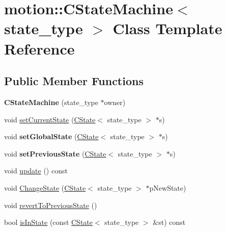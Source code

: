 \hypertarget{classmotion_1_1CStateMachine}{}\section{motion\+:\+:C\+State\+Machine$<$ state\+\_\+type $>$ Class Template Reference}
\label{classmotion_1_1CStateMachine}
\subsection*{Public Member Functions}
\begin{DoxyCompactItemize}
\item 
\mbox{\label{classmotion_1_1CStateMachine_ac91f606bd5d004771294c02a3990f7ed}} 
{\bfseries C\+State\+Machine} (state\+\_\+type $\ast$owner)
\item 
void \mbox{\hyperlink{classmotion_1_1CStateMachine_a57407660e1054b7b6e912efc3afb9495}{set\+Current\+State}} (\mbox{\hyperlink{classmotion_1_1CState}{C\+State}}$<$ state\+\_\+type $>$ $\ast$s)
\item 
\mbox{\label{classmotion_1_1CStateMachine_aaeead01662f75ed768226163665bcec4}} 
void {\bfseries set\+Global\+State} (\mbox{\hyperlink{classmotion_1_1CState}{C\+State}}$<$ state\+\_\+type $>$ $\ast$s)
\item 
\mbox{\label{classmotion_1_1CStateMachine_a55764d2e385cb61f26e6aa09f80577e4}} 
void {\bfseries set\+Previous\+State} (\mbox{\hyperlink{classmotion_1_1CState}{C\+State}}$<$ state\+\_\+type $>$ $\ast$s)
\item 
void \mbox{\hyperlink{classmotion_1_1CStateMachine_a8a944b6b5dcff9b614b434fabcd8955c}{update}} () const
\item 
void \mbox{\hyperlink{classmotion_1_1CStateMachine_ab042e01b5080db6e638ad65f3a5cfab4}{Change\+State}} (\mbox{\hyperlink{classmotion_1_1CState}{C\+State}}$<$ state\+\_\+type $>$ $\ast$p\+New\+State)
\item 
void \mbox{\hyperlink{classmotion_1_1CStateMachine_ae8e1d802793aded65b1da25dad007486}{revert\+To\+Previous\+State}} ()
\item 
bool \mbox{\hyperlink{classmotion_1_1CStateMachine_a562ec539af12a828f189d82d7821ca4a}{is\+In\+State}} (const \mbox{\hyperlink{classmotion_1_1CState}{C\+State}}$<$ state\+\_\+type $>$ \&st) const

\end{DoxyCompactItemize}
